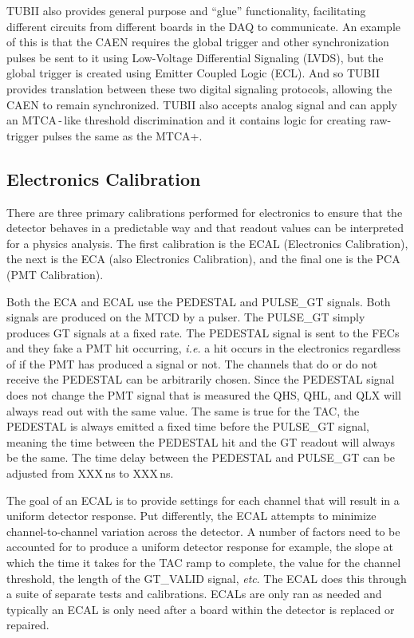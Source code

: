 TUBII also provides general purpose and ``glue'' functionality,
facilitating different circuits from different boards in the DAQ to communicate.
An example of this is that the CAEN requires the global trigger and
other synchronization pulses be sent to it using Low-Voltage Differential
Signaling (LVDS), but the global trigger is created using Emitter Coupled
Logic (ECL).
And so TUBII provides translation between these two digital signaling protocols,
allowing the CAEN to remain synchronized.
TUBII also accepts analog signal and can apply an MTCA\,-\,like threshold
discrimination and it contains logic for creating raw-trigger pulses the
same as the MTCA+.

\subsection{Electronics Calibration}
There are three primary calibrations performed for electronics to ensure that the
detector behaves in a predictable way and that readout values can be interpreted
for a physics analysis. The first calibration is the ECAL (Electronics Calibration),
the next is the ECA (also Electronics Calibration), and the final one is the PCA (PMT
Calibration).

Both the ECA and ECAL use the PEDESTAL and PULSE\_GT signals. Both signals
are produced on the MTCD by a pulser.
The PULSE\_GT simply produces GT signals at a fixed rate.
The PEDESTAL signal is sent to the FECs and they fake a PMT hit occurring,
\textit{i.e.} a hit occurs in the electronics regardless of if the PMT has
produced a signal or not.
The channels that do or do not receive the PEDESTAL can be arbitrarily chosen.
Since the PEDESTAL signal does not change the PMT signal that is measured the
QHS, QHL, and QLX will always read out with the same value. The same is true
for the TAC, the PEDESTAL is always emitted a fixed time before the PULSE\_GT
signal, meaning the time between the PEDESTAL hit and the GT readout will always
be the same.
The time delay between the PEDESTAL and PULSE\_GT can be adjusted from
XXX\,ns to XXX\,ns.


The goal of an ECAL is to provide settings for each channel that will result in a uniform
detector response. Put differently, the ECAL attempts to minimize channel-to-channel variation
across the detector.
A number of factors need to be accounted for to produce a uniform detector response for example,
the slope at which the time it takes for the TAC ramp to complete, the value for the
channel threshold, the length of the GT\_VALID signal, \textit{etc}.
The ECAL does this through a suite of separate tests and calibrations.
ECALs are only ran as needed and typically an ECAL is only need after a board within the
detector is replaced or repaired.

